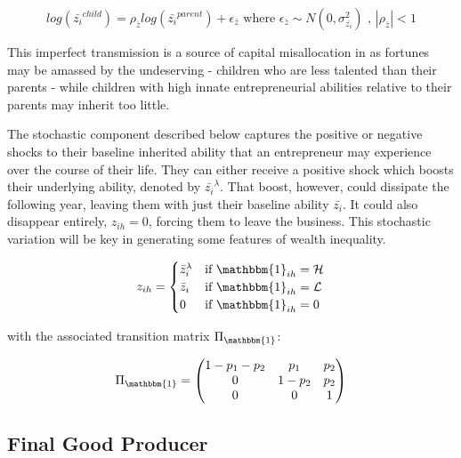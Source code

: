 \documentclass[12pt,a4paper]{article}
\begin{document}
 \[log(\bar{z_i}^{child})=\rho_{\bar{z}} log(\bar{z_i}^{parent})+\epsilon_{\bar{z}} \text{ where }\epsilon_{\bar{z}}\sim N(0, \sigma_{\bar{z_i}}^2) \text{ , } |\rho_{\bar{z}} | < 1\]

\hspace*{6mm} This imperfect transmission is a source of capital misallocation in \cite{GETAL} as fortunes may be amassed by the undeserving - children who are less talented than their parents - while children with high innate entrepreneurial abilities relative to their parents may inherit too little.  

\hspace*{6mm} The stochastic component described below captures the positive or negative shocks to their baseline inherited ability that an entrepreneur may experience over the course of their life. They can either receive a positive shock which boosts their underlying ability, denoted by $\bar{z_i}^\lambda$. That boost, however, could dissipate the following year, leaving them with just their baseline ability $\bar{z_i}$. It could also disappear entirely, $z_{ih}=0$, forcing them to leave the business. 
This stochastic variation will be key in generating some features of wealth inequality. 

\begin{equation}
  z_{ih} =
    \begin{cases}
      \bar{z}_{i}^\lambda & \text{if $\mathbbm{1}_{ih}=\mathcal{H}$}\\
      \bar{z}_{i} & \text{if $\mathbbm{1}_{ih}=\mathcal{L}$}\\
      0 & \text{if $\mathbbm{1}_{ih}=0$}
    \end{cases}       
\end{equation}

with the associated transition matrix $\Pi_{\mathbbm{1}}$:

     
\begin{equation}
\Pi_{\mathbbm{1}} = 
\begin{pmatrix}
1-p_1-p_2 & p_1 & p_2 \\
0 & 1-p_2 & p_2 \\
0 & 0 & 1 
\end{pmatrix}
\end{equation}    



\subsection{\normalsize Final Good Producer}
\end{document}
